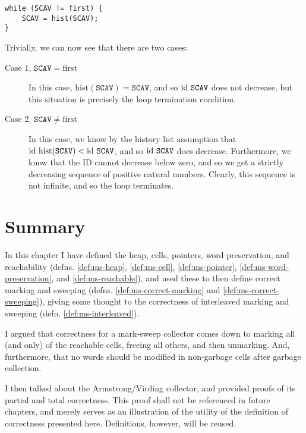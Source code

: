\begin{lstlisting}
while (SCAV != first) {
    SCAV = hist(SCAV);
}
\end{lstlisting}

Trivially, we can now see that there are two cases:

\begin{description}
  \item[Case 1, $\mathtt{SCAV} = \mathrm{first}$] In this case,
    $\mathrm{hist}(\mathtt{SCAV}) = \mathtt{SCAV}$, and so
    $\mathrm{id}~\mathtt{SCAV}$ does not decrease, but this situation is
    precisely the loop termination condition.

  \item[Case 2, $\mathtt{SCAV} \neq \mathrm{first}$] In this case, we
    know by the history list assumption that
    $\mathrm{id}~\mathrm{hist}(\mathtt{SCAV}) < \mathrm{id}~\mathtt{SCAV}$, and so
    $\mathrm{id}~\mathtt{SCAV}$ does decrease. Furthermore, we know that the
    ID cannot decrease below zero, and so we get a strictly decreasing
    sequence of positive natural numbers. Clearly, this sequence is
    not infinite, and so the loop terminates.
\end{description}

\section{Summary}
\label{sec:marksweep-summary}

In this chapter I have defined the heap, cells, pointers, word
preservation, and reachability (defns.  \ref{def:ms-heap},
\ref{def:ms-cell}, \ref{def:ms-pointer},
\ref{def:ms-word-preservation}, and \ref{def:ms-reachable}), and used
these to then define correct marking and sweeping (defns.
\ref{def:ms-correct-marking} and \ref{def:ms-correct-sweeping}),
giving some thought to the correctness of interleaved marking and
sweeping (defn. \ref{def:ms-interleaved}).

I argued that correctness for a mark-sweep collector comes down to
marking all (and only) of the reachable cells, freeing all others, and
then unmarking. And, furthermore, that no words should be modified in
non-garbage cells after garbage collection.

I then talked about the Armstrong/Virding\cite{Armstrong95} collector,
and provided proofs of its partial and total correctness. This proof
shall not be referenced in future chapters, and merely serves as an
illustration of the utility of the definition of correctness presented
here. Definitions, however, will be reused.
